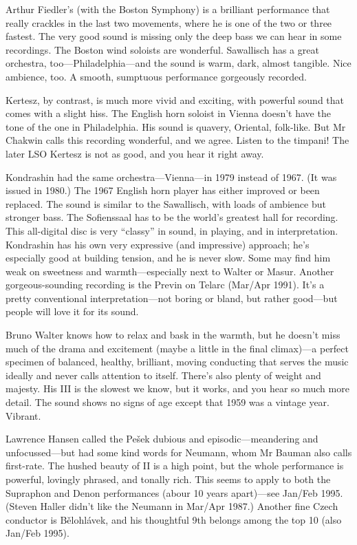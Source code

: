 \documentclass[12pt]{article}%
\begin{document}
Arthur Fiedler's (with the Boston Symphony) is a brilliant performance that really crackles in the last two movements, where he is one of the two or three fastest. The very good sound is missing only the deep bass we can hear in some recordings. The Boston wind soloists are wonderful. Sawallisch has a great orchestra,
too---Philadelphia---and the sound is warm, dark, almost tangible. Nice ambience, too. A smooth, sumptuous performance gorgeously recorded.

Kertesz, by contrast, is much more vivid and exciting, with powerful sound that comes with a slight hiss. The English horn soloist in Vienna doesn't have the tone of the one in Philadelphia. His sound is quavery, Oriental, folk-like. But Mr Chakwin calls this recording wonderful, and we agree. Listen to the timpani! The later LSO Kertesz is not as good, and you hear it right away.

Kondrashin had the same orchestra---Vienna---in 1979 instead of 1967. (It was issued in 1980.) The 1967 English horn player has either improved or been replaced. The sound is similar to the Sawallisch, with loads of ambience but stronger bass. The Sofienssaal has to be the world's greatest hall for recording. This all-digital disc is very ``classy'' in sound, in playing, and in interpretation. Kondrashin has his own very expressive (and impressive) approach; he's especially good at building tension, and he is never slow. Some may find him weak on sweetness and warmth---especially next to Walter or Masur. Another gorgeous-sounding recording is the Previn on Telarc (Mar/Apr 1991). It's a pretty conventional interpretation---not boring or bland, but rather good---but people will love it for its sound. 

Bruno Walter knows how to relax and bask
in the warmth, but he doesn't miss much of
the drama and excitement (maybe a little in the final climax)---a perfect specimen of balanced, healthy, brilliant, moving conducting that serves the music ideally and never calls attention to itself. There's also plenty of weight and majesty. His III is the slowest we know, but it works, and you hear so much more detail. The sound shows no signs of age except that 1959 was a vintage year. Vibrant.

Lawrence Hansen called the Pešek dubious and episodic---meandering and unfocussed---but had some kind words for Neumann, whom Mr Bauman also calls first-rate. The hushed beauty of II is a high point, but the whole performance is powerful, lovingly phrased, and tonally rich. This seems to apply to both the Supraphon and Denon performances (abour 10 years apart)---see Jan/Feb 1995. (Steven Haller didn't like the Neumann in Mar/Apr
1987.) Another fine Czech conductor is Bělohlávek, and his thoughtful 9th belongs among the top 10 (also Jan/Feb 1995).
\end{document}
